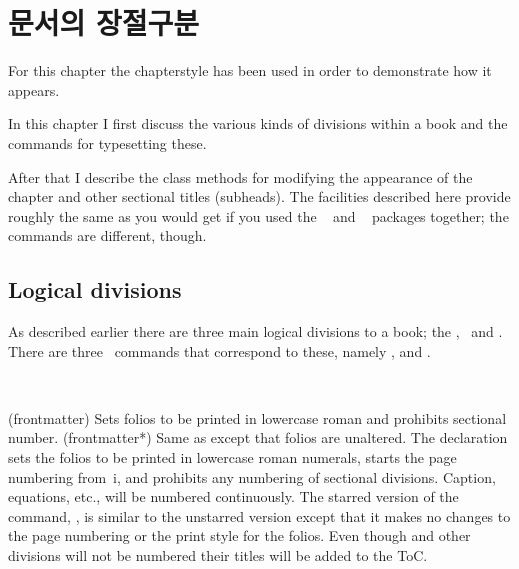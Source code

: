 \chapter{문서의 장절구분}

For this chapter the  chapterstyle has been used in
order to demonstrate how it appears.


In this chapter I first discuss the various kinds of divisions within
a book and the commands for typesetting these.

After that I describe the class methods for modifying the appearance
of the chapter and other sectional titles (subheads).
The facilities described here provide roughly the same as you would
get if you used the ~\cite{TITLESEC} and
~\cite{SECTSTY} packages together; the commands are
different, though.

\section{Logical divisions}

    As described earlier there are three main logical divisions to a book;
the \pixfrontmatter, \pixmainmatter\ and \pixbackmatter. There are three \ltx\
commands that correspond to these, namely \cmd{\frontmatter},
\cmd{\mainmatter} and \cmd{\backmatter}.

\begin{syntax}
\cmd{\frontmatter} \cmd{\frontmatter*} \\
\end{syntax}
\glossary(frontmatter)%
  {}%
  {Sets folios to be printed in lowercase roman and prohibits sectional
   number.}
\glossary(frontmatter*)%
  {}%
  {Same as  except that folios are unaltered.}
The \cmd{\frontmatter} declaration sets the folios to be
printed in lowercase roman numerals, starts the page numbering from~i,
and prohibits any numbering
of sectional divisions. Caption, equations, etc., will be
numbered continuously.  The starred version of the command,
\cmd{\frontmatter*}, is similar to the unstarred version except that it
makes no changes to the page numbering or the print style for the
folios\index{folio}. Even though \cmd{\chapter} and other divisions will not
be numbered their titles will be added to the ToC.

